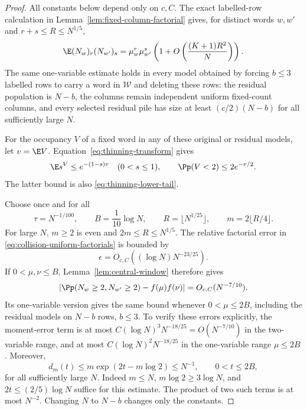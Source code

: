 \begin{proof}
All constants below depend only on $c,C$. The exact labelled-row calculation
in Lemma~\ref{lem:fixed-column-factorial} gives, for distinct words $w,w'$
and $r+s\le R\le N^{1/5}$,
\begin{equation}
\label{eq:collision-uniform-factorials}
 \E(N_w)_r(N_{w'})_s
 =\mu_w^r\mu_{w'}^s\left(1+O\left(\frac{(K+1)R^2}{N}\right)\right).
\end{equation}
The same one-variable estimate holds in every model obtained by forcing
$b\le3$ labelled rows to carry a word in $\mathcal W$ and deleting these
rows: the residual population is $N-b$, the columns remain independent
uniform fixed-count columns, and every selected residual pile has size at
least $(c/2)(N-b)$ for all sufficiently large $N$.

For the occupancy $V$ of a fixed word in any of these original or residual
models, let $v=\E V$. Equation~\eqref{eq:thinning-transform} gives
\begin{equation}
\label{eq:collision-empty-singleton-tail}
 \E s^V\le e^{-(1-s)v}\quad(0<s\le1),\qquad
 \Pp(V<2)\le2e^{-v/2}.
\end{equation}
The latter bound is also \eqref{eq:thinning-lower-tail}.

Choose once and for all
\[
 \tau=N^{-1/100},\qquad B=\frac1{10}\log N,
 \qquad R=\lfloor N^{1/25}\rfloor,
 \qquad m=2\lfloor R/4\rfloor.
\]
For large $N$, $m\ge2$ is even and $2m\le R\le N^{1/5}$.
The relative factorial error in \eqref{eq:collision-uniform-factorials}
is bounded by
\[
 \epsilon=O_{c,C}((\log N)N^{-23/25}).
\]
If $0<\mu,\nu\le B$, Lemma~\ref{lem:central-window} therefore gives
\begin{equation}
\label{eq:collision-central-absolute}
 \left|\Pp(N_w\ge2,N_{w'}\ge2)-f(\mu)f(\nu)\right|
 =O_{c,C}(N^{-7/10}).
\end{equation}
Its one-variable version gives the same bound whenever $0<\mu\le2B$,
including the residual models on $N-b$ rows, $b\le3$.
To verify these errors explicitly, the moment-error term is at most
$C(\log N)^3N^{-18/25}=O(N^{-7/10})$ in the two-variable range,
and at most $C(\log N)^2N^{-18/25}$ in the one-variable range $\mu\le2B$.
Moreover,
\[
 d_m(t)\le m\exp(2t-m\log2)\le N^{-1},\qquad 0<t\le2B,
\]
for all sufficiently large $N$. Indeed $m\le N$, $m\log2\ge3\log N$, and $2t\le(2/5)\log N$ suffice for this estimate. The product of two such terms is at most $N^{-2}$. Changing $N$ to $N-b$ changes only the constants.


\end{proof}
